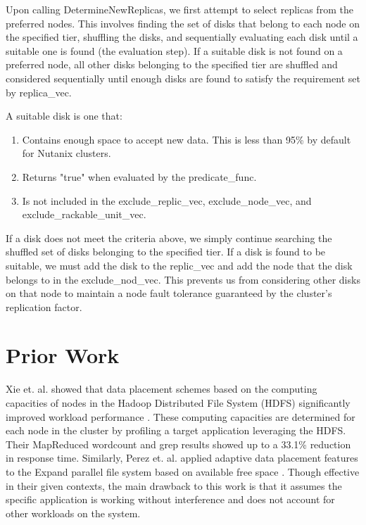 \documentclass[12pt]{article}
\begin{document}
    Upon calling DetermineNewReplicas, we first attempt to select replicas from
    the preferred nodes. This involves finding the set of disks that belong to
    each node on the specified tier, shuffling the disks, and sequentially
    evaluating each disk until a suitable one is found (the evaluation step).
    If a suitable disk is not found on a preferred node, all other disks
    belonging to the specified tier are shuffled and considered sequentially
    until enough disks are found to satisfy the requirement set by replica\_vec.

    A suitable disk is one that:

    \begin{tcolorbox}
    \begin{enumerate}
      \item Contains enough space to accept new data. This is less than 95\% by
            default for Nutanix clusters.  \item Returns "true" when evaluated by the
            predicate\_func.
      \item Is not included in the exclude\_replic\_vec, exclude\_node\_vec,
            and exclude\_rackable\_unit\_vec.
    \end{enumerate}
    \end{tcolorbox}

    If a disk does not meet the criteria above, we simply continue searching
    the shuffled set of disks belonging to the specified tier. If a disk is
    found to be suitable, we must add the disk to the replic\_vec and add the
    node that the disk belongs to in the exclude\_nod\_vec. This prevents us
    from considering other disks on that node to maintain a node fault
    tolerance guaranteed by the cluster's replication factor.

\newpage
\section{Prior Work}

Xie et. al. showed that data placement schemes based on the computing
capacities of nodes in the Hadoop Distributed File System (HDFS) significantly
improved workload performance \cite{hdfs2008}. These computing capacities are
determined for each node in the cluster by profiling a target application
leveraging the
HDFS. Their MapReduced wordcount and grep results showed up to a 33.1\%
reduction in response time. Similarly, Perez et. al. applied adaptive data
placement features to the Expand parallel file system based on available free
space \cite{perez2003}. Though effective in their given contexts, the main drawback to this
work is that it assumes the specific application is working without
interference and does not account for other workloads on the system.
\end{document}
